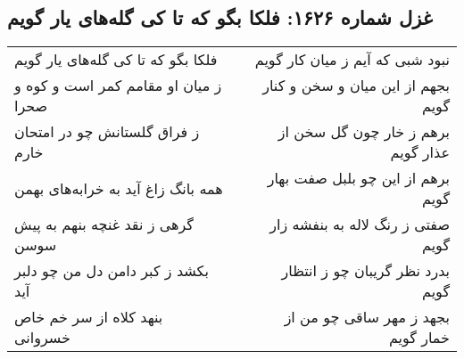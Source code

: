 \begin{center}
\section*{غزل شماره ۱۶۲۶: فلکا بگو که تا کی گله‌های یار گویم}
\label{sec:1626}
\begin{longtable}{l p{0.5cm} r}
فلکا بگو که تا کی گله‌های یار گویم
&&
نبود شبی که آیم ز میان کار گویم
\\
ز میان او مقامم کمر است و کوه و صحرا
&&
بجهم از این میان و سخن و کنار گویم
\\
ز فراق گلستانش چو در امتحان خارم
&&
برهم ز خار چون گل سخن از عذار گویم
\\
همه بانگ زاغ آید به خرابه‌های بهمن
&&
برهم از این چو بلبل صفت بهار گویم
\\
گرهی ز نقد غنچه بنهم به پیش سوسن
&&
صفتی ز رنگ لاله به بنفشه زار گویم
\\
بکشد ز کبر دامن دل من چو دلبر آید
&&
بدرد نظر گریبان چو ز انتظار گویم
\\
بنهد کلاه از سر خم خاص خسروانی
&&
بجهد ز مهر ساقی چو من از خمار گویم
\\
\end{longtable}
\end{center}
